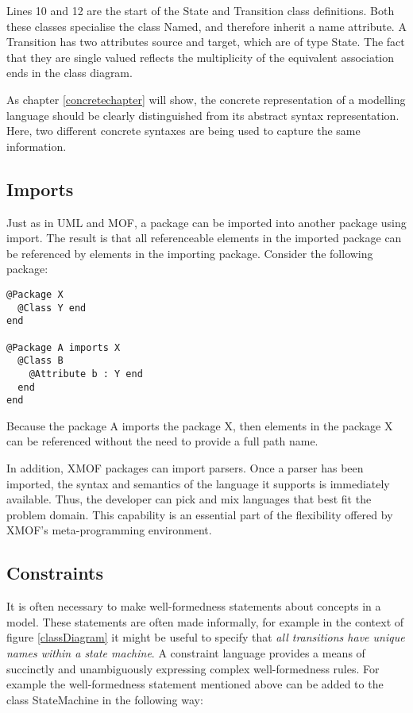 Lines 10 and 12 are the start of the State and Transition class
definitions. Both these classes specialise the class Named, and
therefore inherit a name attribute. A Transition has two attributes
source and target, which are of type State. The fact that they are
single valued reflects the multiplicity of the equivalent
association ends in the class diagram.

As chapter \ref{concretechapter} will show, the concrete
representation of a modelling language should be clearly
distinguished from its abstract syntax representation. Here, two
different concrete syntaxes are being used to capture the same
information.

\subsection{Imports}

Just as in UML and MOF, a package can be imported into another
package using import. The result is that all referenceable
elements in the imported package can be referenced by elements in
the importing package. Consider the following package:

\small
\begin{verbatim}
@Package X
  @Class Y end
end

@Package A imports X
  @Class B
    @Attribute b : Y end
  end
end
\end{verbatim}
\normalsize

Because the package A imports the package X, then elements in the
package X can be referenced without the need to provide a full
path name.

In addition, XMOF packages can import parsers. Once a parser has
been imported, the syntax and semantics of the language it
supports is immediately available. Thus, the developer can pick
and mix languages that best fit the problem domain. This
capability is an essential part of the flexibility offered by
XMOF's meta-programming environment.

\subsection{Constraints}

It is often necessary to make well-formedness statements about
concepts in a model.  These statements are often made informally,
for example in the context of figure \ref{classDiagram} it might
be useful to specify that \emph{all transitions have unique names
within a state machine}. A constraint language provides a means of
succinctly and unambiguously expressing complex well-formedness
rules. For example the well-formedness statement mentioned above
can be added to the class StateMachine in the following way:

